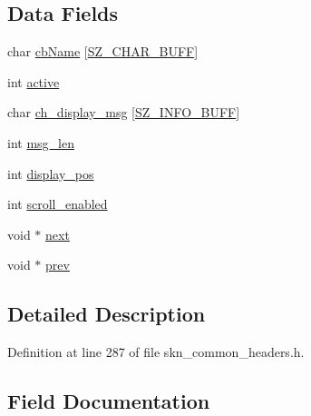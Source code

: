 \subsection*{Data Fields}
\begin{DoxyCompactItemize}
\item 
char \hyperlink{struct___d_i_s_p_l_a_y___l_i_n_e_a3a374d209578adb1d4cea933756fb14a}{cb\+Name} \mbox{[}\hyperlink{skn__common__headers_8h_a8d2978ad614b0de81c60483e706d9306}{S\+Z\+\_\+\+C\+H\+A\+R\+\_\+\+B\+U\+F\+F}\mbox{]}
\item 
int \hyperlink{struct___d_i_s_p_l_a_y___l_i_n_e_acf235d7965b9d52439add787b8e3d316}{active}
\item 
char \hyperlink{struct___d_i_s_p_l_a_y___l_i_n_e_ae5fae9b599281d1d3f619b6e402e7c2c}{ch\+\_\+display\+\_\+msg} \mbox{[}\hyperlink{skn__common__headers_8h_a442d5e93bd9c9d8eb4532aba62b5f86c}{S\+Z\+\_\+\+I\+N\+F\+O\+\_\+\+B\+U\+F\+F}\mbox{]}
\item 
int \hyperlink{struct___d_i_s_p_l_a_y___l_i_n_e_aa9cfa1dd3e90386f675fef61e711342e}{msg\+\_\+len}
\item 
int \hyperlink{struct___d_i_s_p_l_a_y___l_i_n_e_af32b1aa2ce817c27695d7cd43db9364d}{display\+\_\+pos}
\item 
int \hyperlink{struct___d_i_s_p_l_a_y___l_i_n_e_ad92346a9708f3f3ba0c45dfb891c18e3}{scroll\+\_\+enabled}
\item 
void $\ast$ \hyperlink{struct___d_i_s_p_l_a_y___l_i_n_e_a0668a4de4eb91d9bbd03cc52b00f4fd0}{next}
\item 
void $\ast$ \hyperlink{struct___d_i_s_p_l_a_y___l_i_n_e_aadc57636aadef3cff11443217e7f50e5}{prev}
\end{DoxyCompactItemize}


\subsection{Detailed Description}


Definition at line 287 of file skn\+\_\+common\+\_\+headers.\+h.



\subsection{Field Documentation}
\hypertarget{struct___d_i_s_p_l_a_y___l_i_n_e_acf235d7965b9d52439add787b8e3d316}{}
